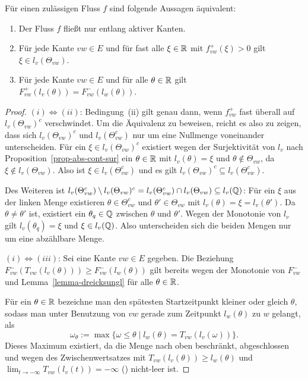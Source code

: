 \begin{lemma}\label{lemma-only-active-edges}
	Für einen zulässigen Fluss $f$ sind folgende Aussagen äquivalent:
	\begin{enumerate}[label=(\roman*)]
		\item Der Fluss $f$ fließt nur entlang aktiver Kanten.
		\item Für jede Kante $vw\in E$ und für fast alle $\xi\in\mathbb{R}$ mit	$f_{vw}^+(\xi)>0$ gilt $\xi \in l_v(\Theta_{vw})$.
		\item Für jede Kante $vw\in E$ und für alle $\theta\in\mathbb{R}$ gilt $F_{vw}^+(l_v(\theta)) = F_{vw}^-(l_w(\theta))$.
	\end{enumerate}
\end{lemma}
\begin{proof}
	$(i) \Leftrightarrow (ii)$: Bedingung~(ii) gilt genau dann, wenn $f_{vw}^+$ fast überall auf $l_v(\Theta_{vw})^c$ verschwindet.
	Um die Äquivalenz zu beweisen, reicht es also zu zeigen, dass sich $l_v(\Theta_{vw})^c$ und $l_v(\Theta_{vw}^c)$ nur um eine Nullmenge voneinander unterscheiden.
	Für ein $\xi\in l_v(\Theta_{vw})^c$ existiert wegen der Surjektivität von $l_v$ nach Proposition~\ref{prop-abs-cont-sur} ein $\theta\in\mathbb{R}$ mit $l_v(\theta)=\xi$ und $\theta\notin\Theta_{vw}$, da $\xi\notin l_v(\Theta_{vw})$. 
	Also ist $\xi\in l_v(\Theta_{vw}^c)$ und es gilt $l_v(\Theta_{vw})^c\subseteq l_v(\Theta_{vw}^c)$.
	
	Des Weiteren ist $l_v(\Theta_{vw}^c)\setminus l_v(\Theta_{vw})^c = l_v(\Theta_{vw}^c)\cap l_v(\Theta_{vw})\subseteq l_v(\mathbb{Q})$:
	Für ein $\xi$ aus der linken Menge existieren $\theta\in\Theta_{vw}^c$ und $\theta'\in\Theta_{vw}$ mit $l_v(\theta)=\xi=l_v(\theta')$.
	Da $\theta\neq\theta'$ ist, existiert ein $\theta_q\in\mathbb{Q}$ zwischen $\theta$ und $\theta'$.
	Wegen der Monotonie von $l_v$ gilt $l_v(\theta_q)=\xi$ und $\xi\in l_v(\mathbb{Q})$.
	Also unterscheiden sich die beiden Mengen nur um eine abzählbare Menge.
	
	$(i)\Leftrightarrow (iii)$: Sei eine Kante $vw\in E$ gegeben.
	Die Beziehung $F_{vw}^-(T_{vw}(l_v(\theta))) \geq F_{vw}^-(l_w(\theta))$ gilt bereits wegen der Monotonie von $F_{vw}^-$ und Lemma~\ref{lemma-dreicksungl} für alle $\theta\in\mathbb{R}$.

	Für ein $\theta\in\mathbb{R}$ bezeichne man den spätesten Startzeitpunkt kleiner oder gleich $\theta$, sodass man unter Benutzung von $vw$ gerade zum Zeitpunkt $l_w(\theta)$ zu $w$ gelangt, als
	$$\omega_\theta:=\max\{ \omega\leq\theta \mid l_w(\theta) = T_{vw}(l_v(\omega)) \}.$$
	Dieses Maximum existiert, da die Menge nach oben beschränkt, abgeschlossen und wegen des Zwischenwertsatzes mit $T_{vw}(l_v(\theta))\geq l_w(\theta)$ und $\lim_{t\to -\infty}T_{vw}(l_v(t))=-\infty$ () nicht-leer ist.
	

\end{proof}
